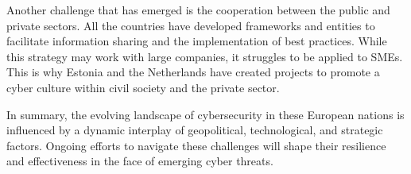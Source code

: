 Another challenge that has emerged is the cooperation between the public and private sectors. All the countries have developed frameworks and entities to facilitate information sharing and the implementation of best practices. While this strategy may work with large companies, it struggles to be applied to SMEs. This is why Estonia and the Netherlands have created projects to promote a cyber culture within civil society and the private sector.

In summary, the evolving landscape of cybersecurity in these European nations is influenced by a dynamic interplay of geopolitical, technological, and strategic factors. Ongoing efforts to navigate these challenges will shape their resilience and effectiveness in the face of emerging cyber threats.


